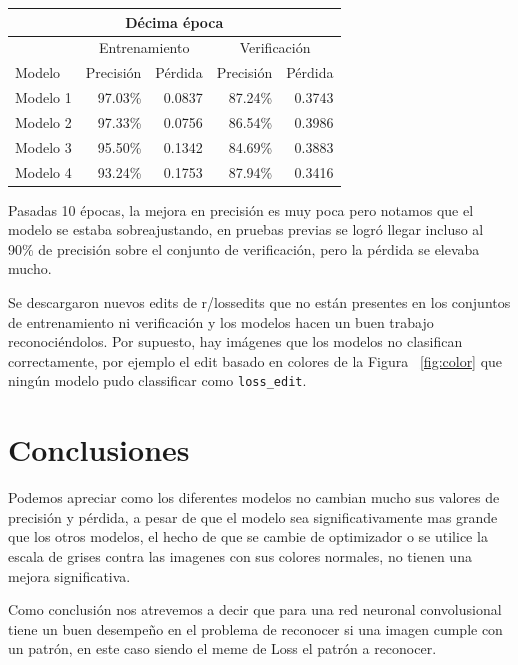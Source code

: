 \documentclass[spanish,11pt,letterpaper]{article}
\begin{document}
\begin{center}
\begin{tabular}{|l||r|r|r|r|}
\hline
\multicolumn{5}{|c|}{Décima época}
\\ \hline
& \multicolumn{2}{|c|}{Entrenamiento} & \multicolumn{2}{|c|}{Verificación}
\\ \hline
Modelo & Precisión & Pérdida & Precisión & Pérdida
\\ \hline
Modelo 1 & 97.03\% & 0.0837 & 87.24\% & 0.3743\\
Modelo 2 & 97.33\% & 0.0756 & 86.54\% & 0.3986\\
Modelo 3 & 95.50\% & 0.1342 & 84.69\% & 0.3883\\
Modelo 4 & 93.24\% & 0.1753 & 87.94\% & 0.3416\\
\hline
\end{tabular}
\end{center}

Pasadas 10 épocas, la mejora en precisión es muy poca pero notamos que el modelo
se estaba sobreajustando, en pruebas previas se logró
llegar incluso al 90\% de precisión sobre el conjunto de verificación, pero la
pérdida se elevaba mucho.

Se descargaron nuevos edits de \textsf{r/lossedits} que no están presentes en
los conjuntos de entrenamiento ni verificación y los modelos hacen un buen trabajo
reconociéndolos. Por supuesto, hay imágenes que los modelos no clasifican
correctamente, por ejemplo el edit basado en colores de la Figura ~\ref{fig:color}
que ningún modelo pudo classificar como \texttt{loss\_edit}.

\section{Conclusiones}

Podemos apreciar como los diferentes modelos no cambian mucho sus valores de precisión y pérdida, a pesar
de que el modelo sea significativamente mas grande que los otros modelos, el hecho de que se cambie de
optimizador o se utilice la escala de grises contra las imagenes con sus colores normales, no tienen una mejora
significativa.

Como conclusión nos atrevemos a decir que para una red neuronal convolusional tiene un buen desempeño en el
problema de reconocer si una imagen cumple con un patrón, en este caso siendo el meme de Loss el patrón a
reconocer.
\end{document}
